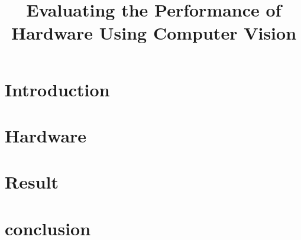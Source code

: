 \documentclass[12pt,journal]{IEEEtran}
\begin{document}



\newpage
\cleardoublepage



\newpage
\setcounter{page}{1}
\title{Evaluating the Performance of Hardware Using Computer Vision}
\maketitle



%   






\section{Introduction}


\section{Hardware}


\section{Result}


\section{conclusion}




\newpage
\printbibliography
\newpage

\onecolumn
\end{document}
